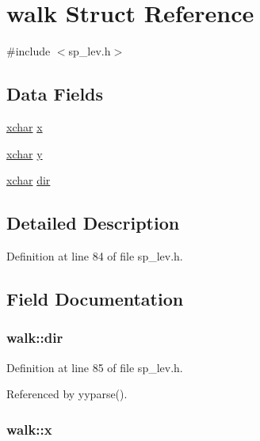 \hypertarget{structwalk}{\section{walk Struct Reference}
\label{structwalk}
}


{\ttfamily \#include $<$sp\+\_\+lev.\+h$>$}

\subsection*{Data Fields}
\begin{DoxyCompactItemize}
\item 
\hyperlink{global_8h_a2043b7d01ce89f4ee2fa6c345a752d32}{xchar} \hyperlink{structwalk_a986ed379ab2f405003986ed393b453d1}{x}
\item 
\hyperlink{global_8h_a2043b7d01ce89f4ee2fa6c345a752d32}{xchar} \hyperlink{structwalk_a738efbffc3ee8b59c522ee8d1a73b37b}{y}
\item 
\hyperlink{global_8h_a2043b7d01ce89f4ee2fa6c345a752d32}{xchar} \hyperlink{structwalk_a538cec5e9c13e1fa970af083c178ad8d}{dir}
\end{DoxyCompactItemize}


\subsection{Detailed Description}


Definition at line 84 of file sp\+\_\+lev.\+h.



\subsection{Field Documentation}
\hypertarget{structwalk_a538cec5e9c13e1fa970af083c178ad8d}{
\subsubsection[{dir}]{ walk\+::dir}}\label{structwalk_a538cec5e9c13e1fa970af083c178ad8d}


Definition at line 85 of file sp\+\_\+lev.\+h.



Referenced by yyparse().

\hypertarget{structwalk_a986ed379ab2f405003986ed393b453d1}{
\subsubsection[{x}]{ walk\+::x}}\label{structwalk_a986ed379ab2f405003986ed393b453d1}


